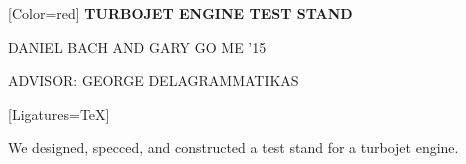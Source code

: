 \documentclass{article}
\begin{document}
{

	[Color=red]
	\fontsize{0.65in}{0.6in}\selectfont 
	\bfseries
	TURBOJET ENGINE TEST STAND
}

\vspace{0.25in}

{
	\fontsize{0.55in}{0.6in}\selectfont
	DANIEL BACH {\fontsize{0.4in}{0.6in}\selectfont AND} GARY GO {\fontsize{0.4in}{0.6in}\selectfont ME '15}
}

\vspace{0.1in}

{
	\fontsize{0.4in}{0.4in}\selectfont
	ADVISOR: GEORGE DELAGRAMMATIKAS
}

\vspace{0.2in}

{
	[Ligatures=TeX]
	\fontsize{0.41in}{0.46in}\selectfont

	We designed, specced, and constructed a test stand for a turbojet engine.
}
\end{document}
